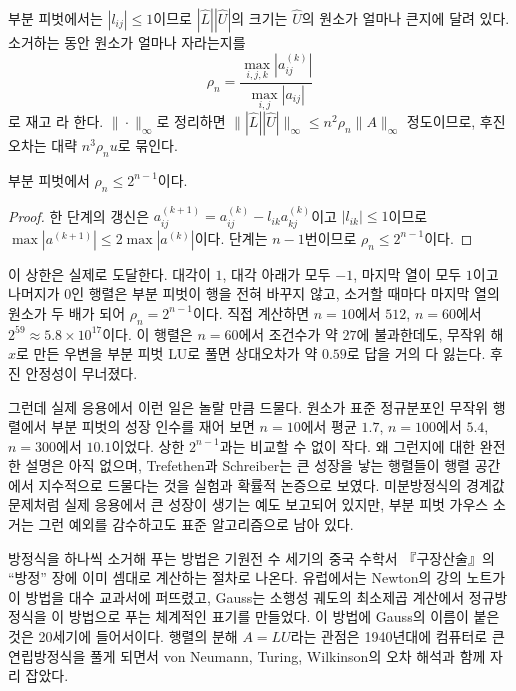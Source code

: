 부분 피벗에서는 $|l_{ij}|\le1$이므로 $|\hat L||\hat U|$의 크기는 $\hat U$의 원소가 얼마나 큰지에 달려 있다. 소거하는 동안 원소가 얼마나 자라는지를
\[
\rho_n=\frac{\max_{i,j,k}|a_{ij}^{(k)}|}{\max_{i,j}|a_{ij}|}
\]
로 재고 라 한다. $\|\cdot\|_\infty$로 정리하면 $\||\hat L||\hat U|\|_\infty\le n^2\rho_n\|A\|_\infty$ 정도이므로, 후진 오차는 대략 $n^3\rho_nu$로 묶인다.

\begin{proposition}
\label{prop:growth-bound}
부분 피벗에서 $\rho_n\le2^{n-1}$이다.
\end{proposition}

\begin{proof}
한 단계의 갱신은 $a_{ij}^{(k+1)}=a_{ij}^{(k)}-l_{ik}a_{kj}^{(k)}$이고 $|l_{ik}|\le1$이므로 $\max|a^{(k+1)}|\le2\max|a^{(k)}|$이다. 단계는 $n-1$번이므로 $\rho_n\le2^{n-1}$이다.
\end{proof}

이 상한은 실제로 도달한다. 대각이 $1$, 대각 아래가 모두 $-1$, 마지막 열이 모두 $1$이고 나머지가 $0$인 행렬은 부분 피벗이 행을 전혀 바꾸지 않고, 소거할 때마다 마지막 열의 원소가 두 배가 되어 $\rho_n=2^{n-1}$이다. 직접 계산하면 $n=10$에서 $512$, $n=60$에서 $2^{59}\approx5.8\times10^{17}$이다. 이 행렬은 $n=60$에서 조건수가 약 $27$에 불과한데도, 무작위 해 $x$로 만든 우변을 부분 피벗 LU로 풀면 상대오차가 약 $0.59$로 답을 거의 다 잃는다. 후진 안정성이 무너졌다.

그런데 실제 응용에서 이런 일은 놀랄 만큼 드물다. 원소가 표준 정규분포인 무작위 행렬에서 부분 피벗의 성장 인수를 재어 보면 $n=10$에서 평균 $1.7$, $n=100$에서 $5.4$, $n=300$에서 $10.1$이었다. 상한 $2^{n-1}$과는 비교할 수 없이 작다. 왜 그런지에 대한 완전한 설명은 아직 없으며, Trefethen과 Schreiber는 큰 성장을 낳는 행렬들이 행렬 공간에서 지수적으로 드물다는 것을 실험과 확률적 논증으로 보였다\cite{trefethen1990average}. 미분방정식의 경계값 문제처럼 실제 응용에서 큰 성장이 생기는 예도 보고되어 있지만\cite{wright1993}, 부분 피벗 가우스 소거는 그런 예외를 감수하고도 표준 알고리즘으로 남아 있다.

\begin{aside}
방정식을 하나씩 소거해 푸는 방법은 기원전 수 세기의 중국 수학서 『구장산술』의 ``방정'' 장에 이미 셈대로 계산하는 절차로 나온다. 유럽에서는 Newton의 강의 노트가 이 방법을 대수 교과서에 퍼뜨렸고, Gauss는 소행성 궤도의 최소제곱 계산에서 정규방정식을 이 방법으로 푸는 체계적인 표기를 만들었다. 이 방법에 Gauss의 이름이 붙은 것은 20세기에 들어서이다. 행렬의 분해 $A=LU$라는 관점은 1940년대에 컴퓨터로 큰 연립방정식을 풀게 되면서 von Neumann, Turing, Wilkinson의 오차 해석과 함께 자리 잡았다\cite{grcar2011}.
\end{aside}

